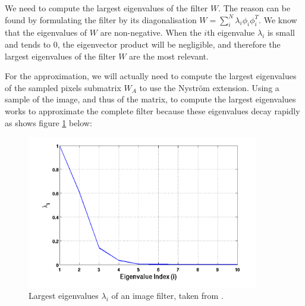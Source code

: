 We need to compute the largest eigenvalues of the filter \(W\).
The reason can be found by formulating the filter by its diagonalisation \(W = \sum_i^N \lambda_i \phi_i \phi_i^T\).
We know that the eigenvalues of \(W\) are non-negative.
When the \(i\)th eigenvalue \(\lambda_i\) is small and tends to 0, the eigenvector product will be negligible, and therefore the largest eigenvalues of the filter \(W\) are the most relevant.

\ifthesis
 For the approximation, we will actually need to compute the largest eigenvalues of the sampled pixels submatrix \(W_A\) to use the Nystr\"om extension.
 Using a sample of the image, and thus of the matrix, to compute the largest eigenvalues works to approximate the complete filter because these eigenvalues decay rapidly as shows figure \ref{fig:eigenvalues} below:
 \begin{figure}[H]
   \centering
   \includegraphics[width=0.9\textwidth]{img/decayingEigenvalues.png}
   \caption{Largest eigenvalues \(\lambda_i\) of an image filter, taken from \cite{siam_slides_2016}.}
   \label{fig:eigenvalues}
 \end{figure}
\fi

